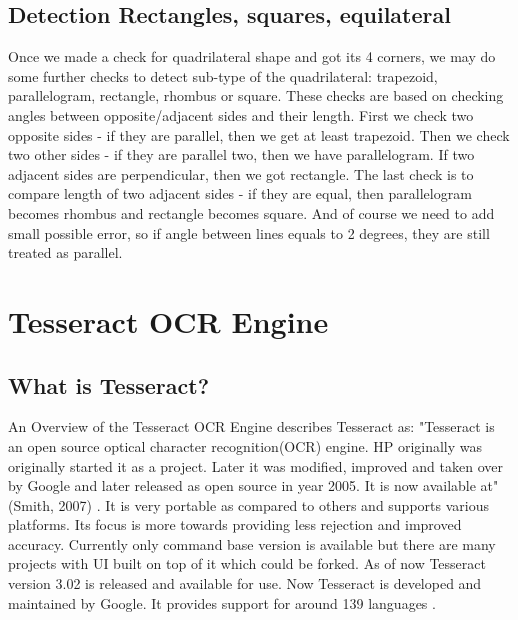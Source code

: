 \subsection{Detection Rectangles, squares, equilateral}
Once we made a check for quadrilateral shape and got its 4 corners, we may do some further checks to detect sub-type of the quadrilateral: trapezoid, parallelogram, rectangle, rhombus or square. These checks are based on checking angles between opposite/adjacent sides and their length. First we check two opposite sides - if they are parallel, then we get at least trapezoid. Then we check two other sides - if they are parallel two, then we have parallelogram. If two adjacent sides are perpendicular, then we got rectangle. The last check is to compare length of two adjacent sides - if they are equal, then parallelogram becomes rhombus and rectangle becomes square. And of course we need to add small possible error, so if angle between lines equals to 2 degrees, they are still treated as parallel. \cite{DetectingShape}
\section{Tesseract OCR Engine}
\subsection{What is Tesseract?}
An Overview of the Tesseract OCR Engine describes Tesseract as: "Tesseract is an open source
optical character recognition(OCR) engine. HP originally was originally started it as a project. Later it was modified, improved and taken over by Google and later released as open source
in year 2005. It is now available at" (Smith, 2007) . It is very portable as compared to others
and supports various platforms. Its focus is more towards providing less rejection and improved
accuracy. Currently only command base version is available but there are many projects with UI
built on top of it which could be forked. As of now Tesseract version 3.02 is released and
available for use. Now Tesseract is developed and maintained by Google. It provides support for
around 139 languages \cite{TesseractORCEngine}.
